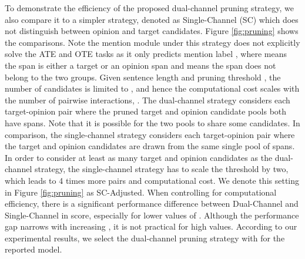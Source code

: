 \documentclass[11pt,a4paper]{article}
\begin{document}
To demonstrate the efficiency of the proposed dual-channel pruning strategy, we also compare it to a simpler strategy, denoted as Single-Channel (SC) which does not distinguish between opinion and target candidates.
Figure \ref{fig:pruning} shows the comparisons.
Note the mention module under this strategy does not explicitly solve the ATE and OTE tasks as it only predicts mention label , where  means the span is either a target or an opinion span and  means the span does not belong to the two groups.
Given sentence length  and pruning threshold , the number of candidates is limited to , and hence the computational cost scales with the number of pairwise interactions, .
The dual-channel strategy considers each target-opinion pair where the pruned target and opinion candidate pools both have  spans. Note that it is possible for the two pools to share some candidates. 
In comparison, the single-channel strategy considers each target-opinion pair where the target and opinion candidates are drawn from the same single pool of  spans.
In order to consider at least as many target and opinion candidates as the dual-channel strategy, the single-channel strategy has to scale the threshold  by two, which leads to 4 times more pairs and computational cost. 
We denote this setting in Figure \ref{fig:pruning} as SC-Adjusted.
When controlling for computational efficiency, there is a significant performance difference between Dual-Channel and Single-Channel in  score, especially for lower values of .
Although the performance gap narrows with increasing , it is not practical for high values.
According to our experimental results, we select the dual-channel pruning strategy with  for the reported model. 
\end{document}
